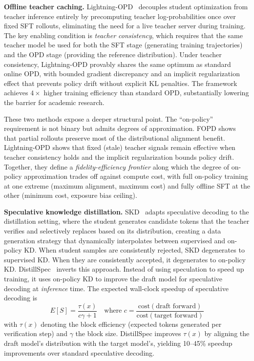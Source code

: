 \documentclass{article} %
\begin{document}
\textbf{Offline teacher caching.} Lightning-OPD~\citep{wu2026lightning} decouples student optimization from teacher inference entirely by precomputing teacher log-probabilities once over fixed SFT rollouts, eliminating the need for a live teacher server during training. The key enabling condition is \emph{teacher consistency}, which requires that the same teacher model be used for both the SFT stage (generating training trajectories) and the OPD stage (providing the reference distribution). Under teacher consistency, Lightning-OPD provably shares the same optimum as standard online OPD, with bounded gradient discrepancy and an implicit regularization effect that prevents policy drift without explicit KL penalties. The framework achieves $4\times$ higher training efficiency than standard OPD, substantially lowering the barrier for academic research.

These two methods expose a deeper structural point. The ``on-policy'' requirement is not binary but admits degrees of approximation. FOPD shows that partial rollouts preserve most of the distributional alignment benefit. Lightning-OPD shows that fixed (stale) teacher signals remain effective when teacher consistency holds and the implicit regularization bounds policy drift. Together, they define a \emph{fidelity-efficiency frontier} along which the degree of on-policy approximation trades off against compute cost, with full on-policy training at one extreme (maximum alignment, maximum cost) and fully offline SFT at the other (minimum cost, exposure bias ceiling).

\textbf{Speculative knowledge distillation.} SKD~\citep{2410.11325} adapts speculative decoding to the distillation setting, where the student generates candidate tokens that the teacher verifies and selectively replaces based on its distribution, creating a data generation strategy that dynamically interpolates between supervised and on-policy KD. When student samples are consistently rejected, SKD degenerates to supervised KD. When they are consistently accepted, it degenerates to on-policy KD. DistillSpec~\citep{2310.08461} inverts this approach. Instead of using speculation to speed up training, it uses on-policy KD to improve the draft model for speculative decoding at \emph{inference} time. The expected wall-clock speedup of speculative decoding is
\begin{equation}
    E[S] = \frac{\tau(x)}{c\gamma + 1} \quad \text{where } c = \frac{\text{cost}(\text{draft forward})}{\text{cost}(\text{target forward})}
\end{equation}
with $\tau(x)$ denoting the block efficiency (expected tokens generated per verification step) and $\gamma$ the block size. DistillSpec improves $\tau(x)$ by aligning the draft model's distribution with the target model's, yielding 10--45\% speedup improvements over standard speculative decoding.
\end{document}
